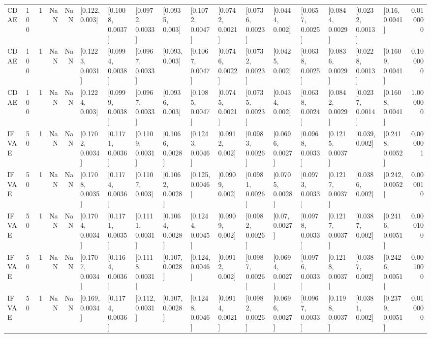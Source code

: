 \begin{tabular}{lllrrllllllllllllr}
    CDAE &  100 &     1 &   NaN &   NaN &    [0.122, 0.003] &  [0.1008, 0.0037] &  [0.0972, 0.0033] &   [0.0935, 0.003] &  [0.1072, 0.0047] &  [0.0742, 0.0021] &  [0.0736, 0.0023] &   [0.0444, 0.002] &  [0.0657, 0.0025] &  [0.0844, 0.0029] &  [0.0232, 0.0013] &    [0.16, 0.0041] &  0.010000 \\
    CDAE &  100 &     1 &   NaN &   NaN &  [0.1223, 0.0031] &  [0.0994, 0.0038] &  [0.0967, 0.0033] &    [0.093, 0.003] &  [0.1067, 0.0047] &  [0.0746, 0.0022] &  [0.0732, 0.0023] &   [0.0425, 0.002] &  [0.0638, 0.0025] &  [0.0836, 0.0029] &  [0.0228, 0.0013] &  [0.1609, 0.0041] &  0.100000 \\
    CDAE &  100 &     1 &   NaN &   NaN &   [0.1224, 0.003] &  [0.0999, 0.0038] &  [0.0967, 0.0033] &   [0.0936, 0.003] &  [0.1085, 0.0047] &  [0.0745, 0.0021] &  [0.0735, 0.0023] &   [0.0434, 0.002] &  [0.0638, 0.0024] &  [0.0842, 0.0029] &  [0.0237, 0.0014] &  [0.1608, 0.0041] &  1.000000 \\
   IFVAE &   50 &     1 &   NaN &   NaN &  [0.1702, 0.0034] &  [0.1171, 0.0036] &  [0.1109, 0.0031] &  [0.1066, 0.0028] &  [0.1243, 0.0046] &   [0.0912, 0.002] &  [0.0983, 0.0026] &  [0.0696, 0.0027] &  [0.0968, 0.0033] &  [0.1215, 0.0037] &    [0.039, 0.002] &  [0.2418, 0.0052] &  0.000001 \\
   IFVAE &   50 &     1 &   NaN &   NaN &  [0.1708, 0.0035] &  [0.1174, 0.0036] &   [0.1107, 0.003] &  [0.1062, 0.0028] &   [0.125, 0.0046] &   [0.0909, 0.002] &  [0.0981, 0.0026] &  [0.0705, 0.0028] &  [0.0973, 0.0033] &  [0.1217, 0.0037] &   [0.0386, 0.002] &   [0.242, 0.0052] &  0.000010 \\
   IFVAE &   50 &     1 &   NaN &   NaN &  [0.1704, 0.0034] &  [0.1171, 0.0035] &  [0.1111, 0.0031] &  [0.1064, 0.0028] &  [0.1244, 0.0045] &   [0.0909, 0.002] &  [0.0982, 0.0026] &    [0.07, 0.0027] &  [0.0978, 0.0033] &  [0.1217, 0.0037] &   [0.0387, 0.002] &  [0.2416, 0.0051] &  0.000100 \\
   IFVAE &   50 &     1 &   NaN &   NaN &  [0.1707, 0.0034] &  [0.1164, 0.0036] &  [0.1118, 0.0031] &   [0.107, 0.0028] &   [0.124, 0.0046] &   [0.0912, 0.002] &  [0.0987, 0.0026] &  [0.0694, 0.0027] &  [0.0976, 0.0033] &  [0.1218, 0.0037] &   [0.0387, 0.002] &  [0.2426, 0.0051] &  0.001000 \\
   IFVAE &   50 &     1 &   NaN &   NaN &   [0.169, 0.0034] &  [0.1174, 0.0036] &   [0.112, 0.0031] &   [0.107, 0.0028] &  [0.1248, 0.0046] &  [0.0914, 0.0021] &  [0.0982, 0.0026] &  [0.0696, 0.0027] &  [0.0967, 0.0033] &  [0.1198, 0.0037] &   [0.0381, 0.002] &  [0.2379, 0.0051] &  0.010000 \\

\end{tabular}
